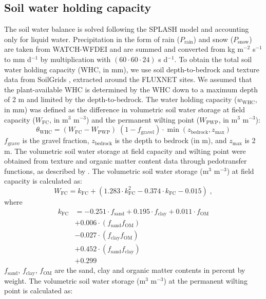 \documentclass[gmd, manuscript]{copernicus}
\begin{document}
\subsection{Soil water holding capacity}
\label{sec:whc}
The soil water balance is solved following the SPLASH model and accounting only for liquid water. Precipitation in the form of rain ($P_{\text{rain}}$) and snow ($P_{\text{snow}}$) are taken from WATCH-WFDEI \citep{Weedon2014-nv} and are summed and converted from kg m$^{-2}$ s$^{-1}$ to mm d$^{-1}$ by multiplication with $(60 \cdot 60 \cdot 24)$ s d$^{-1}$. To obtain the total soil water holding capacity (WHC, in mm), we use soil depth-to-bedrock and texture data from SoilGrids \citep{Hengl2014-jm}, extracted around the FLUXNET sites. We assumed that the plant-available WHC is determined by the WHC down to a maximum depth of 2 m and limited by the depth-to-bedrock. The water holding capacity ($w_\text{WHC}$, in mm) was defined as the difference in volumetric soil water storage at field capacity ($W_{\text{FC}}$, in m$^3$ m$^{-3}$) and the permanent wilting point ($W_{\text{PWP}}$, in m$^3$ m$^{-3}$):
\begin{equation}
\theta_\text{WHC} = (W_{\text{FC}} - W_{\text{PWP}}) \; (1-f_\text{gravel})\cdot \min(z_\text{bedrock}, z_\text{max})
\end{equation}
$f_\text{grave}$ is the gravel fraction, $z_\text{bedrock}$ is the depth to bedrock (in m), and $z_\text{max}$ is 2 m. The volumetric soil water storage at field capacity and wilting point were obtained from texture and organic matter content data through pedotransfer functions, as described by \citet{saxton06}. The volumetric soil water storage (m$^3$ m$^{-3}$) at field capacity is calculated as:
\begin{equation}
W_{\text{FC}}= k_\text{FC}+(1.283\cdot k_\text{FC}^{2}-0.374\cdot k_\text{FC}-0.015)\;, 
\end{equation}
where
\begin{align}
k_\text{FC} &=-0.251\cdot f_{\text{sand}} + 0.195\cdot f_{\text{clay}} + 0.011\cdot f_{\text{OM}}\\                            
&+ 0.006\cdot (f_{\text{sand}} f_{\text{OM}})\\
&- 0.027\cdot (f_{\text{clay}} f_{\text{OM}})\\
&+ 0.452\cdot (f_{\text{sand}} f_{\text{clay}})\\
&+ 0.299
\end{align}
$f_{\text{sand}}$, $f_{\text{clay}}$, $f_{\text{OM}}$ are the sand, clay and organic matter contents in percent by weight. The volumetric soil water storage (m$^3$ m$^{-3}$) at the permanent wilting point is calculated as:
\end{document}
